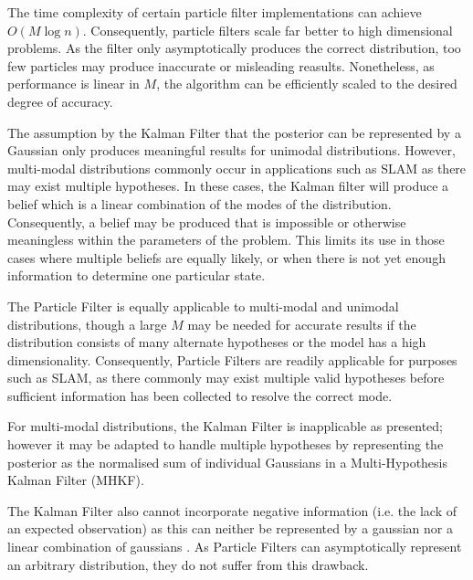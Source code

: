 \documentclass[english]{article}
\begin{document}
The time complexity of certain particle filter implementations can achieve $O(M \log n)$\cite{Thrun02d}. Consequently, particle filters scale far better to high dimensional problems. As the filter only asymptotically produces the correct distribution, too few particles may produce inaccurate or misleading reasults. Nonetheless, as performance is linear in $M$, the algorithm can be efficiently scaled to the desired degree of accuracy.

The assumption by the Kalman Filter that the posterior can be represented by a Gaussian only produces meaningful results for unimodal distributions. However, multi-modal distributions commonly occur in applications such as SLAM as there may exist multiple hypotheses. In these cases, the Kalman filter will produce a belief which is a linear combination of the modes of the distribution. Consequently, a belief may be produced that is impossible or otherwise meaningless within the parameters of the problem. This limits its use in those cases where multiple beliefs are equally likely, or when there is not yet enough information to determine one particular state.

The Particle Filter is equally applicable to multi-modal and unimodal distributions, though a large $M$ may be needed for accurate results if the distribution consists of many alternate hypotheses or the model has a high dimensionality. Consequently, Particle Filters are readily applicable for purposes such as SLAM, as there commonly may exist multiple valid hypotheses before sufficient information has been collected to resolve the correct mode. 

For multi-modal distributions, the Kalman Filter is inapplicable as presented; however it may be adapted to handle multiple hypotheses by representing the posterior as the normalised sum of individual Gaussians in a Multi-Hypothesis Kalman Filter (MHKF)\cite{probrob}.

The Kalman Filter also cannot incorporate negative information (i.e. the lack of an expected observation) as this can neither be represented by a gaussian nor a linear combination of gaussians \cite{Thrun02d}. As Particle Filters can asymptotically represent an arbitrary distribution, they do not suffer from this drawback.
\end{document}
